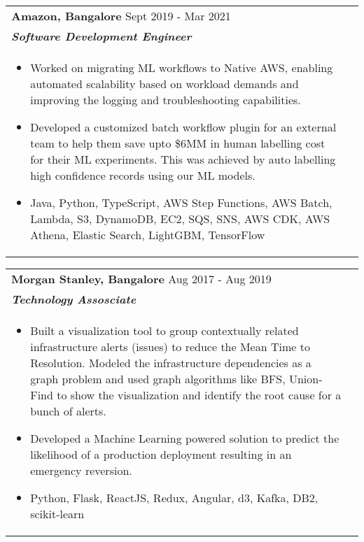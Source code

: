 \documentclass[a4paper,8pt]{article}
\begin{document}
\begin{tabularx}{\linewidth}{ @{}l r@{} }
\color[HTML]{1C033C} \textbf{{Amazon, Bangalore}} \hfill \color[HTML]{371e77} Sept 2019 - Mar 2021 \\[4pt]
\color[HTML]{371e77}\textbf{\textit{Software Development Engineer}}\ \hfill \color[HTML]{4B28A4} \\[5pt]
\begin{minipage}[t]{\linewidth}
    \begin{itemize}[nosep,after=\strut, leftmargin=2em, itemsep=2pt]
        \item Worked on migrating ML workflows to Native AWS, enabling automated scalability based on workload demands and improving the logging and troubleshooting capabilities.
        \item Developed a customized batch workflow plugin for an external team to help them save upto \$6MM in human labelling cost for their ML experiments. This was achieved by auto labelling high confidence records using our ML models.
        \item Java, Python, TypeScript, AWS Step Functions, AWS Batch, Lambda, S3, DynamoDB, EC2, SQS, SNS, AWS CDK, AWS Athena, Elastic Search, LightGBM, TensorFlow       
    \end{itemize}
\end{minipage}
\end{tabularx}

\begin{tabularx}{\linewidth}{ @{}l r@{} }
\color[HTML]{1C033C} \textbf{Morgan Stanley, Bangalore} \hfill \color[HTML]{371e77} Aug 2017 - Aug 2019 \\[4pt]
\color[HTML]{371e77}\textbf{\textit{Technology Assosciate}} \hfill \color[HTML]{4B28A4} \\[5pt]
\begin{minipage}[t]{\linewidth}
    \begin{itemize}[nosep,after=\strut, leftmargin=2em, itemsep=2pt]
        \item Built a visualization tool to group contextually related infrastructure alerts (issues) to reduce the Mean Time to Resolution. Modeled the infrastructure dependencies as a graph problem and used graph algorithms like BFS, Union-Find to show the visualization and identify the root cause for a bunch of alerts.
        \item Developed a Machine Learning powered solution to predict the likelihood of a production deployment resulting in an emergency reversion.
        \item Python, Flask, ReactJS, Redux, Angular, d3, Kafka, DB2, scikit-learn
    \end{itemize}
    \end{minipage}
\end{tabularx}\\[3pt]
\end{document}
